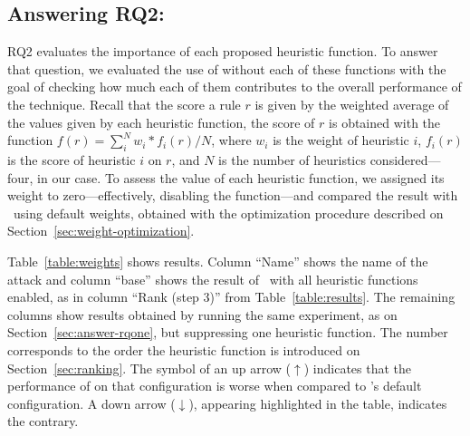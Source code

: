 \documentclass[conference]{IEEEtran}
\begin{document}
\subsection{Answering RQ2: \textRQtwo}
\label{sec:answer-rqtwo}

RQ2 evaluates the importance of each proposed heuristic function. To
answer that question, we evaluated the use of \tname{} without each of
these functions with the goal of checking how much each of them
contributes to the overall performance of the technique. Recall that
the score a rule $r$ is given by the weighted average of the values
given by each heuristic function, \ie{} the score of $r$ is obtained
with the function $f(r)=\sum_{i}^{N} w_i*f_i(r)/N$, where $w_i$ is the
weight of heuristic $i$, $f_i(r)$ is the score of heuristic $i$ on
$r$, and $N$ is the number of heuristics considered---four, in our
case. To assess the value of each heuristic function, we assigned its
weight to zero---effectively, disabling the function---and compared
the result with \tname\ using default weights, obtained with the
optimization procedure described on
Section~\ref{sec:weight-optimization}.

Table~\ref{table:weights} shows results. Column ``Name'' shows the
name of the attack and column ``base'' shows the result of
\tname\ with all heuristic functions enabled, as in column ``Rank
(step 3)'' from Table~\ref{table:results}. The remaining columns show
results obtained by running the same experiment, as on
Section~\ref{sec:answer-rqone}, but suppressing one heuristic
function. The number corresponds to the order the heuristic function
is introduced on Section~\ref{sec:ranking}. The symbol of an up arrow
($\uparrow$) indicates that the performance of \tname{} on that
configuration is worse when compared to \tname's default
configuration. A down arrow ($\downarrow$), appearing highlighted in
the table, indicates the contrary.
\end{document}
